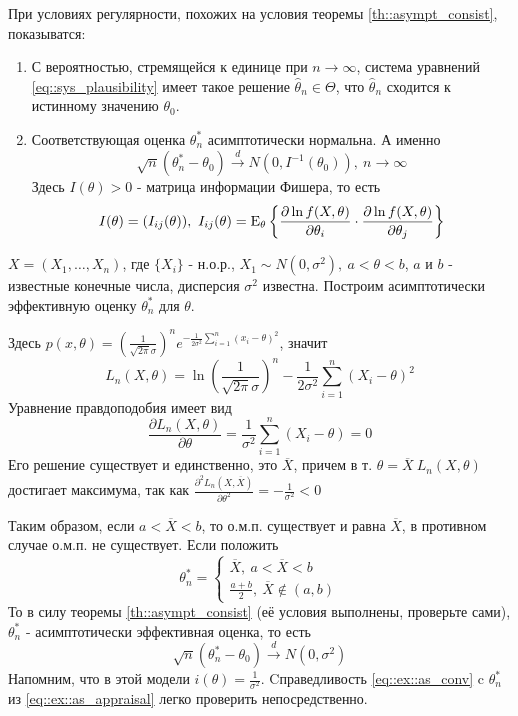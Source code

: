 При условиях регулярности, похожих на условия теоремы \ref{th::asympt_consist},
показыватся:
\begin{enumerate}
    \item С вероятностью, стремящейся к единице при \(n \rightarrow \infty\),
        система уравнений \eqref{eq::sys_plausibility} имеет такое решение \(\widehat{\theta}_n\in\Theta\),
        что \(\widehat{\theta}_n\) сходится к истинному значению \(\theta_0\).
    \item Соответствующая оценка \(\theta^*_n\) асимптотически нормальна. А именно
        \[\sqrt{n}(\theta^*_n - \theta_0) \xrightarrow{d} N(0, I^{-1}(\theta_0)),\ n\rightarrow\infty\]
        Здесь \(I(\theta) > 0\) - матрица информации Фишера, то есть
        \[I(\theta) = (I_{ij}(\theta)),\ I_{ij}(\theta) = \mathrm{E}_\theta \left\{\frac{\partial \ln f(X, \theta)}{\partial\theta_i} \cdot \frac{\partial\ln f(X, \theta)}{\partial\theta_j}\right\}\]
\end{enumerate}
\begin{example}
    \(X = (X_1, \ldots, X_n)\), где \(\{X_i\}\) - н.о.р., \(X_1 \sim N(0, \sigma^2),\ a < \theta < b\),
    \(a\) и \(b\) - известные конечные числа, дисперсия \(\sigma^2\) известна.
    Построим асимптотически эффективную оценку \(\theta^*_n\) для \(\theta\).

    Здесь \(p(x, \theta) = \left(\frac{1}{\sqrt{2\pi} \sigma}\right)^ne^{-\frac{1}{2\sigma^2}\sum_{i=1}^n (x_i-\theta)^2}\),
    значит
    \[L_n(X, \theta) = \ln\left(\frac{1}{\sqrt{2\pi}\sigma}\right)^n - \frac{1}{2\sigma^2}\sum_{i=1}^n(X_i-\theta)^2\]
    Уравнение правдоподобия имеет вид
    \[\frac{\partial L_n(X, \theta)}{\partial\theta} = \frac{1}{\sigma^2}\sum_{i=1}^n(X_i - \theta) = 0\]
    Его решение существует и единственно, это \(\overline{X}\), причем
    в т. \(\theta = \overline{X}\ L_n(X,\theta)\) достигает максимума,
    так как \(\frac{\partial^2 L_n(X, \overline{X})}{\partial\theta^2} = - \frac{1}{\sigma^2} < 0\)

    Таким образом, если \(a < \overline{X} < b\), то о.м.п. существует и равна \(\overline{X}\),
    в противном случае о.м.п. не существует. Если положить
    \begin{equation}
        \label{eq::ex::as_appraisal}
        \theta^*_n = \begin{cases}
            \overline{X},\ a < \overline{X} < b \\
            \frac{a+b}{2},\ \overline{X} \notin (a,b)
        \end{cases}
    \end{equation}
    То в силу теоремы \ref{th::asympt_consist} (её условия
    выполнены, проверьте сами), \(\theta^*_n\) - асимптотически эффективная оценка, то есть
    \begin{equation}
        \label{eq::ex::as_conv}
        \sqrt{n}(\theta^*_n - \theta_0) \xrightarrow{d} N(0, \sigma^2)
    \end{equation}
    Напомним, что в этой модели \(i(\theta) = \frac{1}{\sigma^2}\).
    Cправедливость \eqref{eq::ex::as_conv} c \(\theta^*_n\)
    из \eqref{eq::ex::as_appraisal} легко проверить непосредственно.
\end{example}
